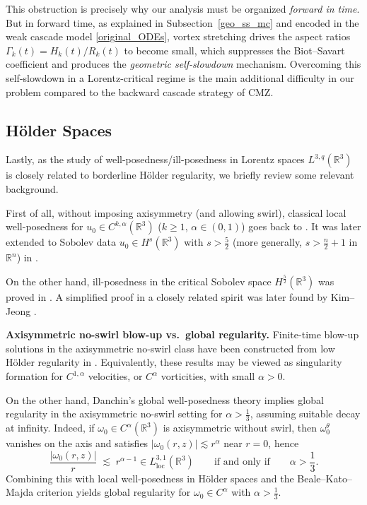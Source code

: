 \documentclass[reqno,11pt]{amsart}
\begin{document}
This obstruction is precisely why our analysis must be organized \emph{forward in time}.
But in forward time, as explained in Subsection~\ref{geo_ss_mc} and encoded in the weak cascade
model \eqref{original_ODEs}, vortex stretching drives the aspect ratios $\Gamma_k(t)=H_k(t)/R_k(t)$ to become
small, which suppresses the Biot--Savart coefficient and produces the \emph{geometric
self-slowdown} mechanism.  Overcoming this self-slowdown in a Lorentz-critical regime is
the main additional difficulty in our problem compared to the backward cascade strategy of
CMZ.




\subsection{H\"older Spaces}
\label{subsec:holder_spaces}
Lastly, as the study of well-posedness/ill-posedness in Lorentz spaces
$L^{3,q}(\mathbb{R}^3)$ is closely related to borderline H\"older regularity, we briefly
review some relevant background.


First of all, without imposing axisymmetry (and allowing swirl), classical local well-posedness for
$u_0\in C^{k,\alpha}(\mathbb{R}^3)$ ($k\ge 1$, $\alpha\in(0,1)$) goes back to
\cite{Lichtenstein30,Gunther27}. It was later extended to Sobolev data
$u_0\in H^s(\mathbb{R}^3)$ with $s>\frac{5}{2}$ (more generally, $s>\frac{n}{2}+1$ in
$\mathbb{R}^n$) in \cite{EbinMarsden70,Kato72}.

On the other hand,
ill-posedness in the critical Sobolev space $H^{\frac{5}{2}}(\mathbb{R}^3)$ was proved
in \cite{BourgainLi15,BourgainLi21}. A simplified proof in a closely related spirit was
later found by Kim--Jeong \cite{KimJeong22}.



\medskip
\noindent\textbf{Axisymmetric no-swirl blow-up vs.\ global regularity.}
Finite-time blow-up solutions in the axisymmetric no-swirl class have been constructed
from low H\"older regularity in \cite{Elgindi21,CordobaMartinezZheng25}.
Equivalently, these results may be viewed as singularity formation for
$C^{1,\alpha}$ velocities, or $C^\alpha$ vorticities, with small $\alpha>0$.

On the other hand, Danchin's global well-posedness theory implies global regularity
in the axisymmetric no-swirl setting for $\alpha>\frac{1}{3}$, assuming suitable decay
at infinity. Indeed, if $\omega_0\in C^\alpha(\mathbb{R}^3)$ is axisymmetric without
swirl, then $\omega_0^\theta$ vanishes on the axis and satisfies
$|\omega_0(r,z)|\lesssim r^\alpha$ near $r=0$, hence
\begin{equation*}
    \frac{|\omega_0(r,z)|}{r}
    \;\lesssim\;
    r^{\alpha-1}
    \in L^{3,1}_{\mathrm{loc}}(\mathbb{R}^3)
    \qquad \text{if and only if}\qquad
    \alpha>\frac{1}{3}.
\end{equation*}
Combining this with local well-posedness in H\"older spaces and the
Beale--Kato--Majda criterion yields global regularity for
$\omega_0\in C^\alpha$ with $\alpha>\frac{1}{3}$.
\end{document}
